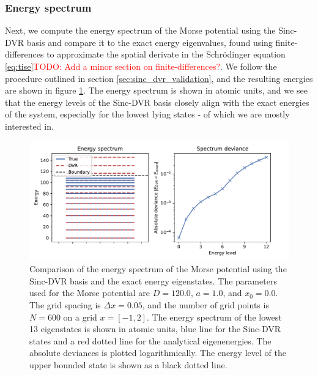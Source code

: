 \documentclass{subfiles}
\begin{document}
\subsubsection*{Energy spectrum}
Next, we compute the energy spectrum of the Morse potential using the Sinc-DVR basis and compare it to the exact energy eigenvalues, found using finite-differences to approximate the spatial derivate in the Schrödinger equation \eqref{eq:tise}\textcolor{red}{TODO: Add a minor section on finite-differences?}. We follow the procedure outlined in section \ref{sec:sinc_dvr_validation}, and the resulting energies are shown in figure \ref{fig:dvr_validation}. The energy spectrum is shown in atomic units, and we see that the energy levels of the Sinc-DVR basis closely align with the exact energies of the system, especially for the lowest lying states - of which we are mostly interested in. 
\begin{figure}[h!]
    \centering
    \includegraphics[width=\textwidth]{figs/dvr_validation.pdf}
    \caption{Comparison of the energy spectrum of the Morse potential using the Sinc-DVR basis and the exact energy eigenstates. The parameters used for the Morse potential are $D = 120.0$, $a = 1.0$, and $x_0 = 0.0$. The grid spacing is $\Delta x = 0.05$, and the number of grid points is $N = 600$ on a grid $x=[-1, 2]$. The energy spectrum of the lowest 13 eigenstates is shown in atomic units, blue line for the Sinc-DVR states and a red dotted line for the analytical eigenenergies. The absolute deviances is plotted logarithmically. The energy level of the upper bounded state is shown as a black dotted line.}
    \label{fig:dvr_validation}
\end{figure}
\end{document}
